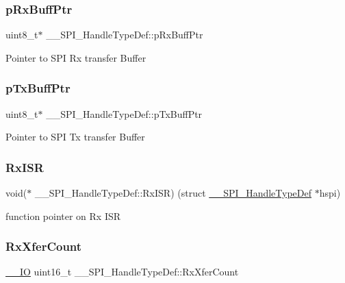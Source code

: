 \subsubsection{\texorpdfstring{pRxBuffPtr}{pRxBuffPtr}}
{\footnotesize\ttfamily uint8\+\_\+t$\ast$ \+\_\+\+\_\+\+S\+P\+I\+\_\+\+Handle\+Type\+Def\+::p\+Rx\+Buff\+Ptr}

Pointer to S\+PI Rx transfer Buffer \mbox{\label{struct_____s_p_i___handle_type_def_adb2e52ab20ae5ae6b89532155fec99af}} 
\subsubsection{\texorpdfstring{pTxBuffPtr}{pTxBuffPtr}}
{\footnotesize\ttfamily uint8\+\_\+t$\ast$ \+\_\+\+\_\+\+S\+P\+I\+\_\+\+Handle\+Type\+Def\+::p\+Tx\+Buff\+Ptr}

Pointer to S\+PI Tx transfer Buffer \mbox{\label{struct_____s_p_i___handle_type_def_a599045b20d284f94e5a367a85cad9f39}} 
\subsubsection{\texorpdfstring{RxISR}{RxISR}}
{\footnotesize\ttfamily void($\ast$ \+\_\+\+\_\+\+S\+P\+I\+\_\+\+Handle\+Type\+Def\+::\+Rx\+I\+SR) (struct \mbox{\hyperlink{struct_____s_p_i___handle_type_def}{\+\_\+\+\_\+\+S\+P\+I\+\_\+\+Handle\+Type\+Def}} $\ast$hspi)}

function pointer on Rx I\+SR \mbox{\label{struct_____s_p_i___handle_type_def_a67e721440b3449d544a27cfd7726c920}} 
\subsubsection{\texorpdfstring{RxXferCount}{RxXferCount}}
{\footnotesize\ttfamily \mbox{\hyperlink{core__sc300_8h_aec43007d9998a0a0e01faede4133d6be}{\+\_\+\+\_\+\+IO}} uint16\+\_\+t \+\_\+\+\_\+\+S\+P\+I\+\_\+\+Handle\+Type\+Def\+::\+Rx\+Xfer\+Count}

